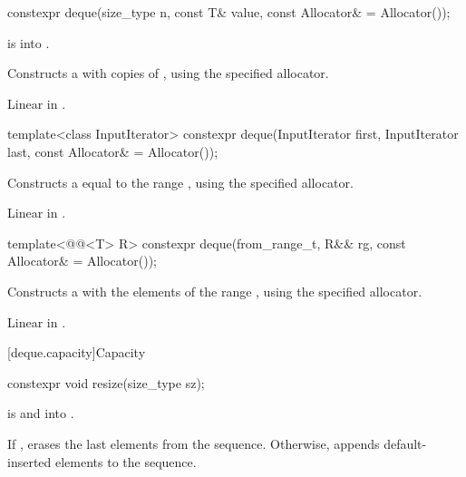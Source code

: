 %
\begin{itemdecl}
constexpr deque(size_type n, const T& value, const Allocator& = Allocator());
\end{itemdecl}

\begin{itemdescr}
\pnum
\expects
{} is  into .

\pnum
\effects
Constructs a
with  copies of ,
using the specified allocator.

\pnum
\complexity
Linear in .
\end{itemdescr}

%
\begin{itemdecl}
template<class InputIterator>
  constexpr deque(InputIterator first, InputIterator last, const Allocator& = Allocator());
\end{itemdecl}

\begin{itemdescr}
\pnum
\effects
Constructs a
equal to the range
,
using the specified allocator.

\pnum
\complexity
Linear in .
\end{itemdescr}

%
\begin{itemdecl}
template<@@<T> R>
  constexpr deque(from_range_t, R&& rg, const Allocator& = Allocator());
\end{itemdecl}

\begin{itemdescr}
\pnum
\effects
Constructs a  with the elements of the range ,
using the specified allocator.

\pnum
\complexity
Linear in .
\end{itemdescr}

[deque.capacity]{Capacity}

%
\begin{itemdecl}
constexpr void resize(size_type sz);
\end{itemdecl}

\begin{itemdescr}
\pnum
\expects
{} is  and  into .

\pnum
\effects
If , erases the last  elements
from the sequence. Otherwise,
appends  default-inserted elements to the sequence.
\end{itemdescr}

